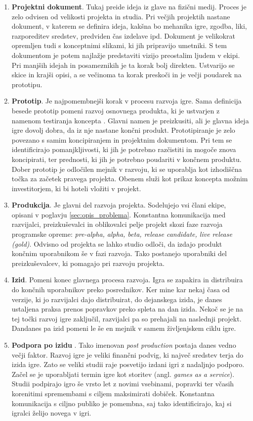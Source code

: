 \documentclass[12pt,a4paper,twoside]{book}
\begin{document}
\begin{enumerate}
	\item \textbf{Projektni dokument}. Tukaj preide ideja iz glave na fizični medij. Proces je zelo odvisen od velikosti projekta in studia. Pri večjih projektih nastane dokument, v katerem se definira ideja, kakšna bo mehanika igre, zgodba, liki, razporeditev sredstev, predviden čas izdelave ipd. Dokument je velikokrat opremljen tudi s konceptnimi slikami, ki jih pripravijo umetniki. S tem dokumentom je potem najlažje predstaviti vizijo preostalim ljudem v ekipi. Pri manjših idejah in posameznikih je ta korak bolj direkten. Ustvarijo se skice in krajši opisi, a se večinoma ta korak preskoči in je večji poudarek na prototipu.
	\item \textbf{Prototip}. Je najpomembnejši korak v procesu razvoja igre. Sama definicija besede prototip pomeni razvoj osnovnega produkta, ki je ustvarjen z namenom testiranja koncepta \cite{blackwell2015prototype}. Glavni namen je preizkusiti, ali je glavna ideja igre dovolj dobra, da iz nje nastane končni produkt. Prototipiranje je zelo povezano s samim koncipiranjem in projektnim dokumentom. Pri tem se identificirajo pomanjkljivosti, ki jih je potrebno razčistiti in mogoče znova koncipirati, ter prednosti, ki jih je potrebno poudariti v končnem produktu. Dober prototip je odločilen mejnik v razvoju, ki se uporablja kot izhodiščna točka za začetek pravega projekta. Obenem služi kot prikaz koncepta možnim investitorjem, ki bi hoteli vložiti v projekt. 
	\item \textbf{Produkcija}. Je glavni del razvoja projekta. Sodelujejo vsi člani ekipe, opisani v poglavju \ref{sec:opis_problema}. Konstantna komunikacija med razvijalci, preizkuševalci in oblikovalci pelje projekt skozi faze razvoja programske opreme: \textit{pre-alpha, alpha, beta, release candidate, live release (gold)}. Odvisno od projekta se lahko studio odloči, da izdajo produkt končnim uporabnikom še v fazi razvoja. Tako postanejo uporabniki del preizkuševalcev, ki pomagajo pri razvoju projekta.
	\item \textbf{Izid}. Pomeni konec glavnega procesa razvoja. Igra se zapakira in distribuira do končnih uporabnikov preko posrednikov. Ker mine kar nekaj časa od verzije, ki jo razvijalci dajo distribuirat, do dejanskega izida, je danes ustaljena praksa prenos popravkov preko spleta na dan izida. Nekoč se je na tej točki razvoj igre zaključil, razvijalci pa so prehajali na naslednji projekt. Dandanes pa izid pomeni le še en mejnik v samem življenjskem ciklu igre.
	\item \textbf{Podpora po izidu} . Tako imenovan \textit{post production} postaja danes vedno večji faktor. Razvoj igre je veliki finančni podvig, ki največ sredstev terja do izida igre. Zato se veliki studii raje posvetijo izdani igri z nadaljnjo podporo. Začel se je uporabljati termin igre kot storitev (angl. \textit{games as a service}). Studii podpirajo igro še vrsto let z novimi vsebinami, popravki ter včasih korenitimi spremembami s ciljem maksimirati dobiček. Konstantna komunikacija s ciljno publiko je pomembna, saj tako identificirajo, kaj si igralci želijo novega v igri.
\end{enumerate}
\end{document}
